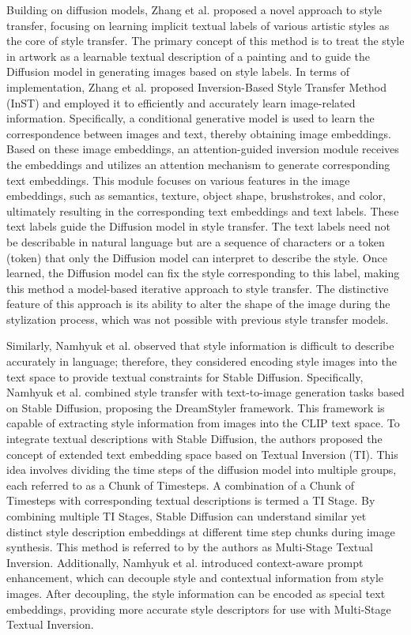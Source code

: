 Building on diffusion models, Zhang et al.\citep{62zhang2023inversion} proposed a novel approach to style transfer, focusing on learning implicit textual labels of various artistic styles as the core of style transfer. The primary concept of this method is to treat the style in artwork as a learnable textual description of a painting and to guide the Diffusion model in generating images based on style labels. In terms of implementation, Zhang et al. proposed Inversion-Based Style Transfer Method (InST) and employed it to efficiently and accurately learn image-related information. Specifically, a conditional generative model is used to learn the correspondence between images and text, thereby obtaining image embeddings. Based on these image embeddings, an attention-guided inversion module receives the embeddings and utilizes an attention mechanism to generate corresponding text embeddings. This module focuses on various features in the image embeddings, such as semantics, texture, object shape, brushstrokes, and color, ultimately resulting in the corresponding text embeddings and text labels. These text labels guide the Diffusion model in style transfer. The text labels need not be describable in natural language but are a sequence of characters or a token (token) that only the Diffusion model can interpret to describe the style. Once learned, the Diffusion model can fix the style corresponding to this label, making this method a model-based iterative approach to style transfer. The distinctive feature of this approach is its ability to alter the shape of the image during the stylization process, which was not possible with previous style transfer models.

Similarly, Namhyuk et al.\citep{63ahn2024dreamstyler} observed that style information is difficult to describe accurately in language; therefore, they considered encoding style images into the text space to provide textual constraints for Stable Diffusion. Specifically, Namhyuk et al.\citep{63ahn2024dreamstyler} combined style transfer with text-to-image generation tasks based on Stable Diffusion, proposing the DreamStyler framework. This framework is capable of extracting style information from images into the CLIP text space.
To integrate textual descriptions with Stable Diffusion, the authors proposed the concept of extended text embedding space based on Textual Inversion (TI). This idea involves dividing the time steps of the diffusion model into multiple groups, each referred to as a Chunk of Timesteps. A combination of a Chunk of Timesteps with corresponding textual descriptions is termed a TI Stage. By combining multiple TI Stages, Stable Diffusion can understand similar yet distinct style description embeddings at different time step chunks during image synthesis. This method is referred to by the authors as Multi-Stage Textual Inversion.
Additionally, Namhyuk et al.\citep{63ahn2024dreamstyler} introduced context-aware prompt enhancement, which can decouple style and contextual information from style images. After decoupling, the style information can be encoded as special text embeddings, providing more accurate style descriptors for use with Multi-Stage Textual Inversion.

